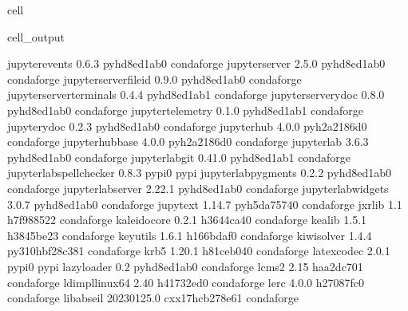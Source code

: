 \documentclass[letterpaper,table,10pt,english]{jupyterBook}
\begin{document}
\begin{sphinxuseclass}{cell}
\begin{sphinxVerbatimOutput}
\begin{sphinxuseclass}{cell_output}
\begin{sphinxVerbatim}[commandchars=\\\{\}]
jupyter\PYGZus{}events            0.6.3              pyhd8ed1ab\PYGZus{}0    conda\PYGZhy{}forge
jupyter\PYGZus{}server            2.5.0              pyhd8ed1ab\PYGZus{}0    conda\PYGZhy{}forge
jupyter\PYGZus{}server\PYGZus{}fileid     0.9.0              pyhd8ed1ab\PYGZus{}0    conda\PYGZhy{}forge
jupyter\PYGZus{}server\PYGZus{}terminals  0.4.4              pyhd8ed1ab\PYGZus{}1    conda\PYGZhy{}forge
jupyter\PYGZus{}server\PYGZus{}ydoc       0.8.0              pyhd8ed1ab\PYGZus{}0    conda\PYGZhy{}forge
jupyter\PYGZus{}telemetry         0.1.0              pyhd8ed1ab\PYGZus{}1    conda\PYGZhy{}forge
jupyter\PYGZus{}ydoc              0.2.3              pyhd8ed1ab\PYGZus{}0    conda\PYGZhy{}forge
jupyterhub                4.0.0              pyh2a2186d\PYGZus{}0    conda\PYGZhy{}forge
jupyterhub\PYGZhy{}base           4.0.0              pyh2a2186d\PYGZus{}0    conda\PYGZhy{}forge
jupyterlab                3.6.3              pyhd8ed1ab\PYGZus{}0    conda\PYGZhy{}forge
jupyterlab\PYGZhy{}git            0.41.0             pyhd8ed1ab\PYGZus{}1    conda\PYGZhy{}forge
jupyterlab\PYGZhy{}spellchecker   0.8.3                    pypi\PYGZus{}0    pypi
jupyterlab\PYGZus{}pygments       0.2.2              pyhd8ed1ab\PYGZus{}0    conda\PYGZhy{}forge
jupyterlab\PYGZus{}server         2.22.1             pyhd8ed1ab\PYGZus{}0    conda\PYGZhy{}forge
jupyterlab\PYGZus{}widgets        3.0.7              pyhd8ed1ab\PYGZus{}0    conda\PYGZhy{}forge
jupytext                  1.14.7             pyh5da7574\PYGZus{}0    conda\PYGZhy{}forge
jxrlib                    1.1                  h7f98852\PYGZus{}2    conda\PYGZhy{}forge
kaleido\PYGZhy{}core              0.2.1                h3644ca4\PYGZus{}0    conda\PYGZhy{}forge
kealib                    1.5.1                h3845be2\PYGZus{}3    conda\PYGZhy{}forge
keyutils                  1.6.1                h166bdaf\PYGZus{}0    conda\PYGZhy{}forge
kiwisolver                1.4.4           py310hbf28c38\PYGZus{}1    conda\PYGZhy{}forge
krb5                      1.20.1               h81ceb04\PYGZus{}0    conda\PYGZhy{}forge
latexcodec                2.0.1                    pypi\PYGZus{}0    pypi
lazy\PYGZus{}loader               0.2                pyhd8ed1ab\PYGZus{}0    conda\PYGZhy{}forge
lcms2                     2.15                 haa2dc70\PYGZus{}1    conda\PYGZhy{}forge
ld\PYGZus{}impl\PYGZus{}linux\PYGZhy{}64          2.40                 h41732ed\PYGZus{}0    conda\PYGZhy{}forge
lerc                      4.0.0                h27087fc\PYGZus{}0    conda\PYGZhy{}forge
libabseil                 20230125.0      cxx17\PYGZus{}hcb278e6\PYGZus{}1    conda\PYGZhy{}forge

\end{sphinxVerbatim}
\end{sphinxuseclass}
\end{sphinxVerbatimOutput}
\end{sphinxuseclass}
\end{document}
